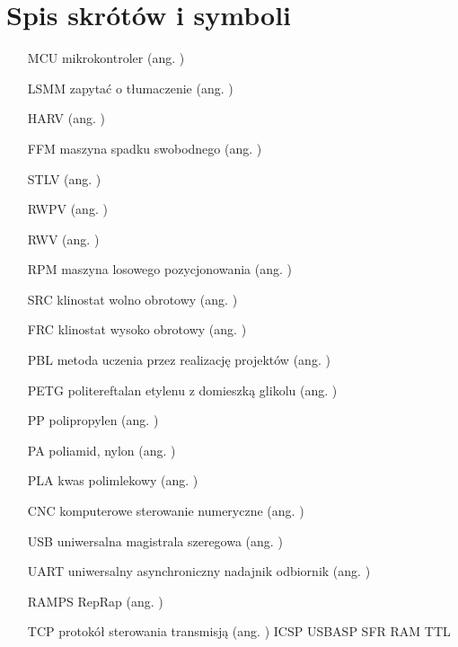 \chapter*{Spis skrótów i symboli}

\begin{itemize}
	\item[MCU] mikrokontroler (ang. )
	\item[LSMM] zapytać o tłumaczenie  (ang. )
	\item[HARV]   ({ang. })
	\item[FFM] maszyna spadku swobodnego ({ang. })
	\item[STLV]  ({ang. })
	\item[RWPV]  ({ang. })
	\item[RWV]  ({ang. })
	\item[RPM] maszyna losowego pozycjonowania ({ang. })
	\item[SRC] klinostat wolno obrotowy ({ang. })
	\item[FRC] klinostat wysoko obrotowy  ({ang. })
	\item[PBL] metoda uczenia przez realizację projektów   ({ang. })
	\item[PETG] politereftalan etylenu z domieszką glikolu  ({ang. })
	\item[PP] polipropylen ({ang. })
	\item[PA] poliamid, nylon ({ang. })
	\item[PLA] kwas polimlekowy ({ang. })
	\item[CNC] komputerowe sterowanie numeryczne ({ang. })
	\item[USB] uniwersalna magistrala szeregowa ({ang. })
	\item[UART] uniwersalny asynchroniczny nadajnik odbiornik ({ang. })
	\item[RAMPS] RepRap   ({ang. })
	\item[TCP] protokół sterowania transmisją ({ang. })
	ICSP
	USBASP
	SFR
	RAM
	TTL
\end{itemize}

